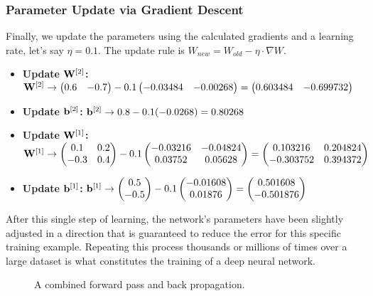 \subsubsection{Parameter Update via Gradient Descent}
Finally, we update the parameters using the calculated gradients and a learning rate, let's say $\eta = 0.1$. The update rule is $W_{new} = W_{old} - \eta \cdot \nabla W$.
\begin{itemize}
    \item \textbf{Update $\mathbf{W}^{[2]}$:} $\mathbf{W}^{[2]} \to \begin{pmatrix} 0.6 & -0.7 \end{pmatrix} - 0.1 \begin{pmatrix} -0.03484 & -0.00268 \end{pmatrix} = \begin{pmatrix} 0.603484 & -0.699732 \end{pmatrix}$
    \item \textbf{Update $\mathbf{b}^{[2]}$:} $\mathbf{b}^{[2]} \to 0.8 - 0.1(-0.0268) = 0.80268$
    \item \textbf{Update $\mathbf{W}^{[1]}$:} $\mathbf{W}^{[1]} \to \begin{pmatrix} 0.1 & 0.2 \\ -0.3 & 0.4 \end{pmatrix} - 0.1 \begin{pmatrix} -0.03216 & -0.04824 \\ 0.03752 & 0.05628 \end{pmatrix} = \begin{pmatrix} 0.103216 & 0.204824 \\ -0.303752 & 0.394372 \end{pmatrix}$
    \item \textbf{Update $\mathbf{b}^{[1]}$:} $\mathbf{b}^{[1]} \to \begin{pmatrix} 0.5 \\ -0.5 \end{pmatrix} - 0.1 \begin{pmatrix} -0.01608 \\ 0.01876 \end{pmatrix} = \begin{pmatrix} 0.501608 \\ -0.501876 \end{pmatrix}$
\end{itemize}
After this single step of learning, the network's parameters have been slightly adjusted in a direction that is guaranteed to reduce the error for this specific training example. Repeating this process thousands or millions of times over a large dataset is what constitutes the training of a deep neural network.

\begin{figure}[h!]
    \centering
    \scalebox{0.6}{\combineddiagram}
    \caption{A combined forward pass and back propagation.}
    \label{fig:combine}
\end{figure}

\ifdefined\ispartofbook
\else
  
  
\fi
